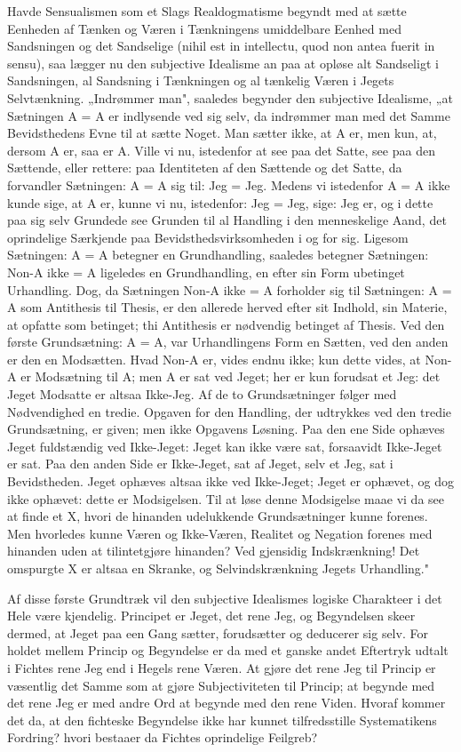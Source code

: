 \documentclass[12pt]{book}
\newcommand{\opage}[1]{\marginnote{\footnotesize\textit{[#1]}}}
\begin{document}
Havde Sensualismen som et Slags Realdogmatisme begyndt med at sætte Eenheden af
Tænken og Væren i Tænkningens umiddelbare Eenhed med Sandsningen og det Sandselige
(nihil est in intellectu, quod non antea fuerit in sensu), saa lægger nu den
subjective Idealisme an paa at opløse alt Sandseligt i Sandsningen, al Sandsning i
Tænkningen og al tænkelig Væren i Jegets Selvtænkning. „Indrømmer man", saaledes
begynder den subjective Idealisme, „at Sætningen A = A er indlysende ved sig selv, da
indrømmer man med det Samme Bevidsthedens Evne til at sætte Noget. Man sætter ikke,
at A er, men kun, at, dersom A er, saa er A. Ville vi nu, istedenfor at see paa det
Satte, see paa den Sættende, eller rettere: paa Identiteten af den Sættende og det
Satte, da forvandler Sætningen: A = A sig til: Jeg = Jeg. Medens vi istedenfor A = A
ikke
\opage{32} kunde sige, at A er, kunne vi nu, istedenfor: Jeg = Jeg, sige: Jeg er, og i dette paa
sig selv Grundede see Grunden til al Handling i den menneskelige Aand, det
oprindelige Særkjende paa Bevidsthedsvirksomheden i og for sig. Ligesom Sætningen: A
= A betegner en Grundhandling, saaledes betegner Sætningen: Non-A ikke = A ligeledes
en Grundhandling, en efter sin Form ubetinget Urhandling. Dog, da Sætningen Non-A
ikke = A forholder sig til Sætningen: A = A som Antithesis til Thesis, er den allerede
herved efter sit Indhold, sin Materie, at opfatte som betinget; thi Antithesis er
nødvendig betinget af Thesis. Ved den første Grundsætning: A = A, var Urhandlingens
Form en Sætten, ved den anden er den en Modsætten. Hvad Non-A er, vides endnu ikke;
kun dette vides, at Non-A er Modsætning til A; men A er sat ved Jeget; her er kun
forudsat et Jeg: det Jeget Modsatte er altsaa Ikke-Jeg. Af de to Grundsætninger
følger med Nødvendighed en tredie. Opgaven for den Handling, der udtrykkes ved den
tredie Grundsætning, er given; men ikke Opgavens Løsning. Paa den ene Side ophæves
Jeget fuldstændig ved Ikke-Jeget: Jeget kan ikke være sat, forsaavidt Ikke-Jeget er
sat. Paa den anden Side er Ikke-Jeget, sat af Jeget, selv et Jeg, sat i Bevidstheden.
Jeget ophæves altsaa ikke ved Ikke-Jeget; Jeget er ophævet, og dog ikke ophævet:
dette er Modsigelsen. Til at løse denne Modsigelse maae vi da see at finde et X,
hvori de hinanden udelukkende Grundsætninger kunne forenes. Men hvorledes kunne Væren
og Ikke-Væren, Realitet og Negation forenes med hinanden uden at tilintetgjøre
hinanden? Ved gjensidig Indskrænkning! Det omspurgte X er altsaa en Skranke, og
Selvindskrænkning Jegets Urhandling."

Af disse første Grundtræk vil den subjective Idealismes logiske Charakteer i det Hele
være kjendelig. Principet er Jeget, det rene Jeg, og Begyndelsen skeer dermed, at
Jeget paa een Gang sætter, forudsætter og deducerer sig selv. For%
\opage{33} holdet mellem Princip og Begyndelse er da med et ganske andet Eftertryk udtalt i
Fichtes rene Jeg end i Hegels rene Væren. At gjøre det rene Jeg til Princip er
væsentlig det Samme som at gjøre Subjectiviteten til Princip; at begynde med det rene
Jeg er med andre Ord at begynde med den rene Viden. Hvoraf kommer det da, at den
fichteske Begyndelse ikke har kunnet tilfredsstille Systematikens Fordring? hvori
bestaaer da Fichtes oprindelige Feilgreb?
\end{document}

